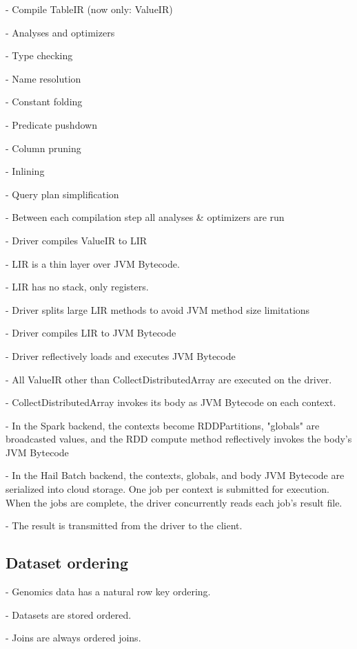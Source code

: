 \documentclass[10pt,a4paper%
]{article}
\begin{document}
        - Compile TableIR (now only: ValueIR)

      - Analyses and optimizers

        - Type checking

        - Name resolution

        - Constant folding

        - Predicate pushdown

        - Column pruning

        - Inlining

        - Query plan simplification

      - Between each compilation step all analyses \& optimizers are run

    - Driver compiles ValueIR to LIR

      - LIR is a thin layer over JVM Bytecode.

      - LIR has no stack, only registers.

    - Driver splits large LIR methods to avoid JVM method size limitations

    - Driver compiles LIR to JVM Bytecode

    - Driver reflectively loads and executes JVM Bytecode

      - All ValueIR other than CollectDistributedArray are executed on the driver.

      - CollectDistributedArray invokes its body as JVM Bytecode on each context.

        - In the Spark backend, the contexts become RDDPartitions, "globals" are broadcasted values, and the RDD compute method reflectively invokes the body’s JVM Bytecode

        - In the Hail Batch backend, the contexts, globals, and body JVM Bytecode are serialized into cloud storage. One job per context is submitted for execution. When the jobs are complete, the driver concurrently reads each job’s result file.

    - The result is transmitted from the driver to the client.

\subsection{Dataset ordering}

    - Genomics data has a natural row key ordering.

    - Datasets are stored ordered.

    - Joins are always ordered joins.
\end{document}
